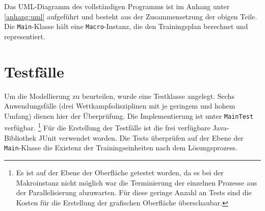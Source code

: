 Das UML-Diagramm des vollständigen Programms ist im Anhang unter \ref{anhang:uml} aufgeführt und besteht aus der Zusammensetzung der obigen Teile. Die \texttt{Main}-Klasse hält eine \texttt{Macro}-Instanz, die den Trainingsplan berechnet und representiert.

\section{Testfälle}
Um die Modellierung zu beurteilen, wurde eine Testklasse angelegt. Sechs Anwendungsfälle (drei Wettkampfsdisziplinen mit je geringem und hohem Umfang) dienen hier der Überprüfung. Die Implementierung ist unter \texttt{MainTest} verfügbar. \footnote{Es ist auf der Ebene der Oberfläche getestet worden, da es bei der Makroinstanz nicht möglich war die Terminierung der einzelnen Prozesse aus der Parallelisierung abzuwarten. Für diese geringe Anzahl an Tests sind die Kosten für die Erstellung der grafischen Oberfläche überschaubar.}
Für die Erstellung der Testfälle ist die frei verfügbare Java-Bibliothek JUnit verwendet worden. Die Tests überprüfen auf der Ebene der \texttt{Main}-Klasse die Existenz der Trainingseinheiten nach dem Lösungsprozess. 



